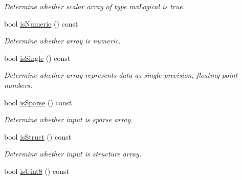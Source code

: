 \begin{DoxyCompactItemize}
\begin{DoxyCompactList}\small\item\em \-Determine whether scalar array of type mx\-Logical is true. \end{DoxyCompactList}\item 
\hypertarget{class_mx_array_a7173969e8eb1169af140f12eb764b7f6}{bool \hyperlink{class_mx_array_a7173969e8eb1169af140f12eb764b7f6}{is\-Numeric} () const }\label{class_mx_array_a7173969e8eb1169af140f12eb764b7f6}

\begin{DoxyCompactList}\small\item\em \-Determine whether array is numeric. \end{DoxyCompactList}\item 
\hypertarget{class_mx_array_af6e7c2d0573ed3bc16aa25636de42b7f}{bool \hyperlink{class_mx_array_af6e7c2d0573ed3bc16aa25636de42b7f}{is\-Single} () const }\label{class_mx_array_af6e7c2d0573ed3bc16aa25636de42b7f}

\begin{DoxyCompactList}\small\item\em \-Determine whether array represents data as single-\/precision, floating-\/point numbers. \end{DoxyCompactList}\item 
\hypertarget{class_mx_array_a01a1a25a8fbc13d6864d9162966583f7}{bool \hyperlink{class_mx_array_a01a1a25a8fbc13d6864d9162966583f7}{is\-Sparse} () const }\label{class_mx_array_a01a1a25a8fbc13d6864d9162966583f7}

\begin{DoxyCompactList}\small\item\em \-Determine whether input is sparse array. \end{DoxyCompactList}\item 
\hypertarget{class_mx_array_ae97b9a35a8a3b1ac14997de351636182}{bool \hyperlink{class_mx_array_ae97b9a35a8a3b1ac14997de351636182}{is\-Struct} () const }\label{class_mx_array_ae97b9a35a8a3b1ac14997de351636182}

\begin{DoxyCompactList}\small\item\em \-Determine whether input is structure array. \end{DoxyCompactList}\item 
\hypertarget{class_mx_array_afcaef8b9519b3aa5964b2c8f6fc6c039}{bool \hyperlink{class_mx_array_afcaef8b9519b3aa5964b2c8f6fc6c039}{is\-Uint8} () const }\label{class_mx_array_afcaef8b9519b3aa5964b2c8f6fc6c039}


\end{DoxyCompactItemize}
